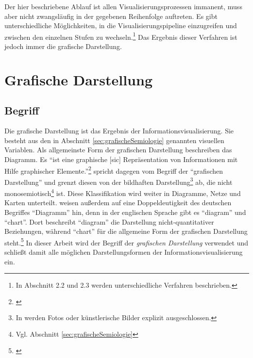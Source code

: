 \documentclass[a4paper, 
               12pt,
               DIV=calc,
               version=first,
               pdftex,
               headsepline,
               footsepline,
               bibtotocnumbered,
               liststotocnumbered]{scrreprt}
\begin{document}
Der hier beschriebene Ablauf ist allen Visualisierungsprozessen immanent, muss aber nicht zwangsläufig
in der gegebenen Reihenfolge auftreten. Es gibt unterschiedliche Möglichkeiten, in die
Visualisierungspipeline einzugreifen und zwischen den einzelnen Stufen zu wechseln.\footnote{In
\citep{Schumann} Abschnitt 2.2 und 2.3 werden unterschiedliche Verfahren beschrieben.}
Das Ergebnis dieser Verfahren ist jedoch immer die grafische Darstellung.

\section{Grafische Darstellung}
\label{sec:Darstellungen}
\subsection{Begriff}
Die grafische Darstellung ist das Ergebnis der Informationsvisualisierung. Sie besteht
aus den in Abschnitt \ref{sec:grafischeSemiologie} genannten
visuellen Variablen.
Als allgemeinste Form der grafischen Darstellung beschreiben \cite{Schumann} das
Diagramm. Es "`ist eine graphische [sic] Repräsentation von Informationen mit Hilfe
graphischer Elemente."'\footnote{\citep[S.\,126]{Schumann}} \cite{Bertin} spricht dagegen
vom Begriff der "`grafischen Darstellung"' und grenzt diesen von
der bildhaften Darstellung\footnote{In \cite{Bertin} werden Fotos oder künstlerische Bilder explizit ausgeschlossen.}
ab, die nicht monosemiotisch\footnote{Vgl. Abschnitt \ref{sec:grafischeSemiologie}} ist.
Diese Klassifikation wird weiter in Diagramme, Netze
und Karten unterteilt. \cite{Schumann} weisen außerdem auf eine Doppeldeutigkeit
des deutschen Begriffes "`Diagramm"' hin, denn in der englischen Sprache gibt es "`diagram"' und "`chart"'.
Dort beschreibt "`diagram"' die Darstellung nicht-quantitativer Beziehungen, während "`chart"' für die
allgemeine Form der grafischen Darstellung steht.\footnote{\citep[S.\,126]{Schumann}}
In dieser Arbeit wird der Begriff der \textit{grafischen Darstellung} verwendet und schließt
damit alle möglichen Darstellungsformen der Informationsvisualisierung ein.
\end{document}
